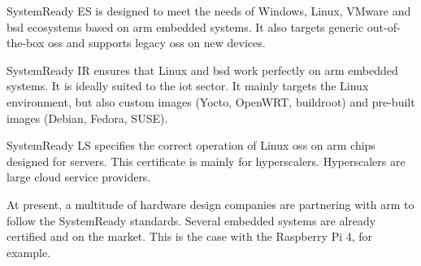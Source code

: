 SystemReady ES is designed to meet the needs of Windows, Linux, VMware and \acrshort{bsd} ecosystems based on \gls{arm} embedded systems. It also targets generic out-of-the-box \acrshort{os}s and supports legacy \acrshort{os}s on new devices. \cite{systemready_program}

SystemReady IR ensures that Linux and \acrshort{bsd} work perfectly on \gls{arm} embedded systems. It is ideally suited to the \acrshort{iot} sector. It mainly targets the Linux environment, but also custom images (Yocto, OpenWRT, buildroot) and pre-built images (Debian, Fedora, SUSE). \cite{systemready_program}

SystemReady LS specifies the correct operation of Linux \acrshort{os}s on \gls{arm} chips designed for servers. This certificate is mainly for hyperscalers. Hyperscalers are large \gls{cloud} service providers. \cite{systemready_program}

At present, a multitude of hardware design companies are partnering with \gls{arm} to follow the SystemReady standards. Several embedded systems are already certified and on the market. This is the case with the Raspberry Pi 4, for example.